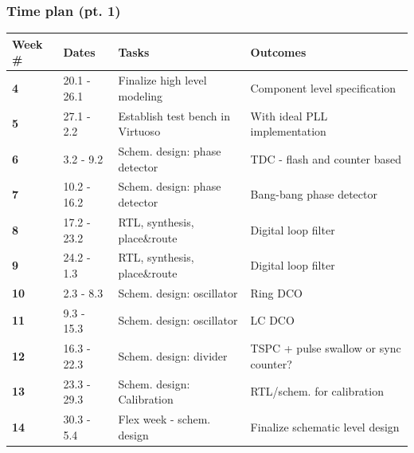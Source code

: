 \documentclass[t, screen, aspectratio=43]{beamer}
\begin{document}
\begin{frame}
	\frametitle{Time plan (pt. 1)}
	\begin{table}[htb!]
		\tiny
		\centering
		\vspace{-1em}
		\def\arraystretch{1.5}		
		\setlength\arrayrulewidth{0.75pt}
		\setlength{\tabcolsep}{1em} %
		\begin{tabular}{|l|l|l|l|}
			\hline 
			\rule[-1ex]{0pt}{2.5ex} \cellcolor{gray!40}\textbf{Week \#} & \cellcolor{gray!40}\textbf{Dates} &\cellcolor{gray!40}\textbf{Tasks} & \cellcolor{gray!40}\textbf{Outcomes}\\ 
			\hline 
			\rule[-1ex]{0pt}{2.5ex} \textbf{4}& 20.1 - 26.1 & Finalize high level modeling & Component level specification\\ 
			\hline 
			\rule[-1ex]{0pt}{2.5ex} \textbf{5}& 27.1 - 2.2 & Establish test bench in Virtuoso & With ideal PLL implementation\\ 
			\hline 
			\rule[-1ex]{0pt}{2.5ex} \textbf{6}& 3.2 - 9.2& Schem. design: phase detector & TDC - flash and counter based \\ 
			\hline 
			\rule[-1ex]{0pt}{2.5ex} \textbf{7}& 10.2 - 16.2& Schem. design: phase detector & Bang-bang phase detector\\ 
			\hline 
			\rule[-1ex]{0pt}{2.5ex} \textbf{8}&17.2 - 23.2& RTL, synthesis, place\&route & Digital loop filter\\ 
			\hline 
			\rule[-1ex]{0pt}{2.5ex} \textbf{9}&24.2 - 1.3& RTL, synthesis, place\&route & Digital loop filter\\ 
			\hline 
			\rule[-1ex]{0pt}{2.5ex} \textbf{10}&2.3 - 8.3& Schem. design: oscillator & Ring DCO\\ 
			\hline 
			\rule[-1ex]{0pt}{2.5ex} \textbf{11}&9.3 - 15.3& Schem. design: oscillator & LC DCO\\ 
			\hline 
			\rule[-1ex]{0pt}{2.5ex} \textbf{12}&16.3 - 22.3& Schem. design: divider  &TSPC + pulse swallow or sync counter?\\ 
			\hline 
			\rule[-1ex]{0pt}{2.5ex} \textbf{13}&23.3 - 29.3&Schem. design: Calibration& RTL/schem. for calibration\\ 
			\hline 
			\rule[-1ex]{0pt}{2.5ex} \textbf{14}& 30.3 - 5.4 &  Flex week - schem. design & Finalize schematic level design\\ 

\end{tabular}
\end{table}
\end{frame}
\end{document}
